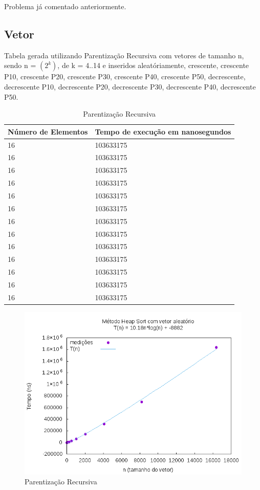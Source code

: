 \documentclass[12pt,a4paper,twoside]{report}
\begin{document}
Problema já comentado anteriormente.

\subsection{Vetor}
Tabela gerada utilizando Parentização Recursiva com vetores de tamanho n, sendo n = $(2^k)$, de k = 4..14 e inseridos aleatóriamente, crescente, crescente P10, crescente P20, crescente P30, crescente P40, crescente P50, decrescente, decrescente P10, decrescente P20, decrescente P30, decrescente P40, decrescente P50.
\begin{table}[H]
\centering
\caption{Parentização Recursiva}
\label{my-label}
\begin{tabular}{|l|l|}
\hline
\multicolumn{1}{|c|}{\textbf{Número de Elementos}} & \multicolumn{1}{c|}{\textbf{Tempo de execução em nanosegundos}} \\ \hline
16 & 103633175 \\ \hline
16 & 103633175 \\ \hline
16 & 103633175 \\ \hline
16 & 103633175 \\ \hline
16 & 103633175 \\ \hline
16 & 103633175 \\ \hline
16 & 103633175 \\ \hline
16 & 103633175 \\ \hline
16 & 103633175 \\ \hline
16 & 103633175 \\ \hline
16 & 103633175 \\ \hline
16 & 103633175 \\ \hline
16 & 103633175 \\ \hline
\end{tabular}
\end{table}

\begin{figure}[H]
    \centering
    \includegraphics[width=0.7\linewidth]{graficos/HeapSort/vIntAleatorio/vIntAleatorio.png}
  \caption{Parentização Recursiva}
\end{figure}
\end{document}
